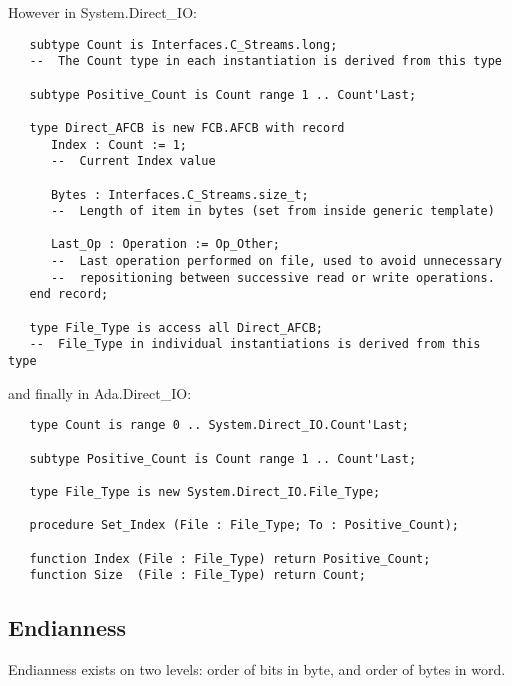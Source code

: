 \documentclass[a4paper,10pt]{article}
\begin{document}
However in System.Direct\_IO:

\begin{verbatim}
   subtype Count is Interfaces.C_Streams.long;
   --  The Count type in each instantiation is derived from this type

   subtype Positive_Count is Count range 1 .. Count'Last;

   type Direct_AFCB is new FCB.AFCB with record
      Index : Count := 1;
      --  Current Index value

      Bytes : Interfaces.C_Streams.size_t;
      --  Length of item in bytes (set from inside generic template)

      Last_Op : Operation := Op_Other;
      --  Last operation performed on file, used to avoid unnecessary
      --  repositioning between successive read or write operations.
   end record;

   type File_Type is access all Direct_AFCB;
   --  File_Type in individual instantiations is derived from this type
\end{verbatim}

and finally in Ada.Direct\_IO:

\begin{verbatim}
   type Count is range 0 .. System.Direct_IO.Count'Last;

   subtype Positive_Count is Count range 1 .. Count'Last;

   type File_Type is new System.Direct_IO.File_Type;

   procedure Set_Index (File : File_Type; To : Positive_Count);

   function Index (File : File_Type) return Positive_Count;
   function Size  (File : File_Type) return Count;

\end{verbatim}




\subsection{Endianness}

Endianness exists on two levels: order of bits in byte, 
and order of bytes in word.
\end{document}
